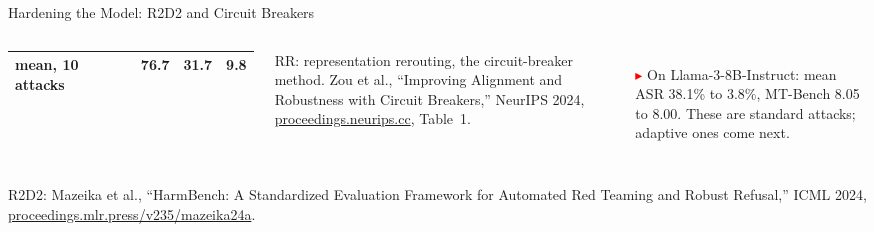 \begin{frame}{Hardening the Model: R2D2 and Circuit Breakers}
\begin{columns}[T,onlytextwidth]
{\begin{tabular}{l r r r}
        mean, 10 attacks & 76.7 & 31.7 & 9.8 \\
        \bottomrule
      \end{tabular}\par}
      \vspace{0.2em}
      {\scriptsize RR: representation rerouting, the circuit-breaker method. Zou et al., ``Improving Alignment and Robustness with Circuit Breakers,'' NeurIPS 2024, \href{https://proceedings.neurips.cc/paper_files/paper/2024/hash/97ca7168c2c333df5ea61ece3b3276e1-Abstract-Conference.html}{proceedings.neurips.cc}, Table~1.\par}
      \vspace{0.3em}
      \begin{itemize}\footnotesize\itemsep0.2em
        \item[\textcolor{red}{$\blacktriangleright$}] On Llama-3-8B-Instruct: mean ASR 38.1\% to 3.8\%, MT-Bench 8.05 to 8.00. These are standard attacks; adaptive ones come next.
      \end{itemize}
  \end{columns}
  \vspace{0.1em}
  {\scriptsize R2D2: Mazeika et al., ``HarmBench: A Standardized Evaluation Framework for Automated Red Teaming and Robust Refusal,'' ICML 2024, \href{https://proceedings.mlr.press/v235/mazeika24a.html}{proceedings.mlr.press/v235/mazeika24a}.}
\end{frame}

